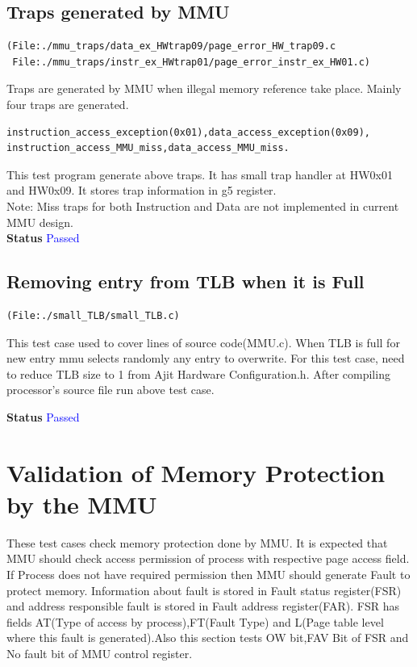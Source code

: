 \documentclass[12pt,a4paper]{article}
\begin{document}
\subsection{Traps generated by MMU}
\begin{lstlisting}
(File:./mmu_traps/data_ex_HWtrap09/page_error_HW_trap09.c
 File:./mmu_traps/instr_ex_HWtrap01/page_error_instr_ex_HW01.c)
\end{lstlisting}
Traps are generated by MMU when illegal memory reference take place. Mainly four traps are generated.
\begin{lstlisting}
instruction_access_exception(0x01),data_access_exception(0x09),
instruction_access_MMU_miss,data_access_MMU_miss.
\end{lstlisting}
This test program generate above traps. It has small trap handler at HW0x01 and HW0x09.
It stores trap information in g5 register.\\
Note: Miss traps for both Instruction and Data are not implemented in current MMU design.\\
\textbf{Status} \textcolor{blue}{Passed}
\subsection{Removing entry from TLB when it is Full}
\begin{lstlisting}
(File:./small_TLB/small_TLB.c)
\end{lstlisting}
This test case used to cover lines of source code(MMU.c).
When TLB is full for new entry mmu selects randomly any entry to overwrite. 
For this test case, need to reduce TLB size to 1 from Ajit Hardware Configuration.h. After compiling processor's source file run above test case.

\textbf{Status} \textcolor{blue}{Passed}
\newpage
\section{Validation of Memory Protection by the MMU}

These test cases check memory protection done by MMU. It is expected that MMU should check access permission of  process  with respective page access field. If Process does not have required permission then MMU should generate Fault to protect memory. Information about fault is stored in Fault status register(FSR) and address responsible fault is stored in Fault address register(FAR).
FSR has fields AT(Type of access by process),FT(Fault Type) and L(Page table level where this fault is generated).Also this section tests OW bit,FAV Bit of FSR and No fault bit of MMU control register.\\
\end{document}
